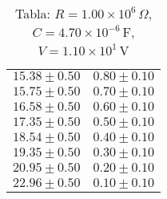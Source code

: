\begin{table}[H]
\begin{tabular}{|c|c|}
$15.38 \pm 0.50$ & $0.80 \pm 0.10$ \\
$15.75 \pm 0.50$ & $0.70 \pm 0.10$ \\
$16.58 \pm 0.50$ & $0.60 \pm 0.10$ \\
$17.35 \pm 0.50$ & $0.50 \pm 0.10$ \\
$18.54 \pm 0.50$ & $0.40 \pm 0.10$ \\
$19.35 \pm 0.50$ & $0.30 \pm 0.10$ \\
$20.95 \pm 0.50$ & $0.20 \pm 0.10$ \\
$22.96 \pm 0.50$ & $0.10 \pm 0.10$ \\
\hline
\end{tabular}
\caption*{Tabla: $R = 1.00 \times 10^{6}\,\Omega$, $C = 4.70 \times 10^{-6}$\,F, $V = 1.10 \times 10^{1}$\,V}
\end{table}
